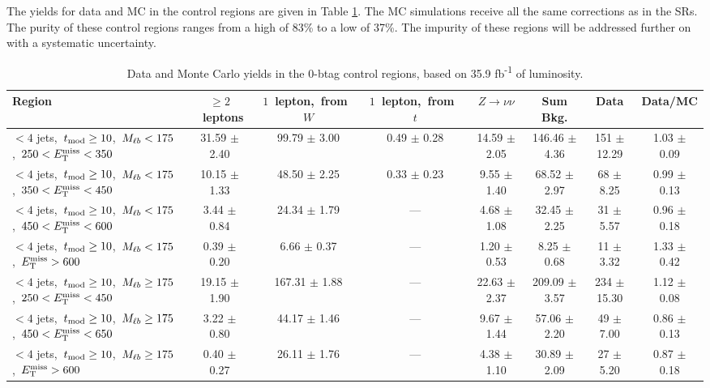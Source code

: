 The yields for data and MC in the control regions are given in Table
\ref{tab:stop:1lw:cryields}. The MC simulations receive all the same
corrections as in the SRs. The purity of these control regions ranges
from a high of 83\% to a low of 37\%. The impurity of these regions
will be addressed further on with a systematic uncertainty.

\begin{table}
\centering
\scriptsize
\caption{Data and Monte Carlo yields in the 0-btag control regions,
  based on 35.9 fb\textsuperscript{-1} of luminosity.}
\label{tab:stop:1lw:cryields}
\begin{tabular}{|l|c c c c c|c|c|}
\hline
Region  & $\ge2$~leptons & $1$~lepton,~from~$W$ & $1$~lepton,~from~$t$ & $Z\rightarrow\nu\nu$ & Sum Bkg. & Data & Data/MC \\*
\hline \hline
$<4$ jets,~$t_\text{mod} \ge10$,~$M_{\ell b}<175$,~$250<E_\text{T}^\text{miss}<350$        & 31.59 $\pm$ 2.40 & 99.79 $\pm$ 3.00  & 0.49 $\pm$ 0.28 & 14.59 $\pm$ 2.05 & 146.46 $\pm$ 4.36 & 151 $\pm$ 12.29 & 1.03 $\pm$ 0.09 \\
$<4$ jets,~$t_\text{mod} \ge10$,~$M_{\ell b}<175$,~$350<E_\text{T}^\text{miss}<450$        & 10.15 $\pm$ 1.33 & 48.50 $\pm$ 2.25  & 0.33 $\pm$ 0.23 & 9.55 $\pm$ 1.40  & 68.52 $\pm$ 2.97  & 68 $\pm$ 8.25   & 0.99 $\pm$ 0.13 \\
$<4$ jets,~$t_\text{mod} \ge10$,~$M_{\ell b}<175$,~$450<E_\text{T}^\text{miss}<600$        & 3.44 $\pm$ 0.84  & 24.34 $\pm$ 1.79  &       ---       & 4.68 $\pm$ 1.08  & 32.45 $\pm$ 2.25  & 31 $\pm$ 5.57   & 0.96 $\pm$ 0.18 \\
$<4$ jets,~$t_\text{mod} \ge10$,~$M_{\ell b}<175$,~$E_\text{T}^\text{miss}>600$            & 0.39 $\pm$ 0.20  & 6.66 $\pm$ 0.37   &       ---       & 1.20 $\pm$ 0.53  & 8.25 $\pm$ 0.68   & 11 $\pm$ 3.32   & 1.33 $\pm$ 0.42 \\
\hline
$<4$ jets,~$t_\text{mod} \ge10$,~$M_{\ell b}\ge175$,~$250<E_\text{T}^\text{miss}<450$      & 19.15 $\pm$ 1.90 & 167.31 $\pm$ 1.88 &       ---       & 22.63 $\pm$ 2.37 & 209.09 $\pm$ 3.57 & 234 $\pm$ 15.30 & 1.12 $\pm$ 0.08 \\
$<4$ jets,~$t_\text{mod} \ge10$,~$M_{\ell b}\ge175$,~$450<E_\text{T}^\text{miss}<650$      & 3.22 $\pm$ 0.80  & 44.17 $\pm$ 1.46  &       ---       & 9.67 $\pm$ 1.44  & 57.06 $\pm$ 2.20  & 49 $\pm$ 7.00   & 0.86 $\pm$ 0.13 \\
$<4$ jets,~$t_\text{mod} \ge10$,~$M_{\ell b}\ge175$,~$E_\text{T}^\text{miss}>600$          & 0.40 $\pm$ 0.27  & 26.11 $\pm$ 1.76  &       ---       & 4.38 $\pm$ 1.10  & 30.89 $\pm$ 2.09  & 27 $\pm$ 5.20   & 0.87 $\pm$ 0.18 \\

\end{tabular}
\end{table}
